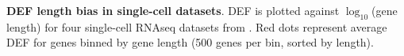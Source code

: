 \textbf{DEF length bias in single-cell datasets}. DEF is plotted against $\log_{10}$(gene length) for four single-cell RNAseq datasets from \citep{Zeisel_2015,Tasic_2016,Zeisel_2018,Saunders_2018}. Red dots represent average DEF for genes binned by gene length (500 genes per bin, sorted by length).

